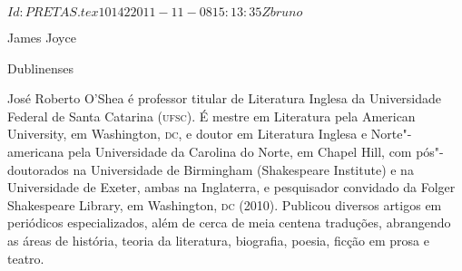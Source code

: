 \SVN $Id: PRETAS.tex 10142 2011-11-08 15:13:35Z bruno $
\begin{resumopage}

\item[James Joyce] 

\item[Dublinenses] 
        
\item[José Roberto O'Shea] é professor titular de Literatura Inglesa da 
Universidade Federal de Santa Catarina (\textsc{ufsc}). 
É mestre em Literatura pela American University, em Washington, \textsc{dc}, 
e doutor em Literatura Inglesa e Norte"-americana pela Universidade da Carolina 
do Norte, em Chapel Hill, com pós"-doutorados na Universidade de Birmingham 
(Shakespeare Institute) e na Universidade de Exeter, ambas na Inglaterra, e pesquisador 
convidado da Folger Shakespeare Library, em Washington, \textsc{dc} (2010).
Publicou diversos artigos em periódicos especializados, além de cerca de 
meia centena traduções, abrangendo as áreas de história, teoria da literatura, 
biografia, poesia, ficção em prosa e teatro.


\end{resumopage}

